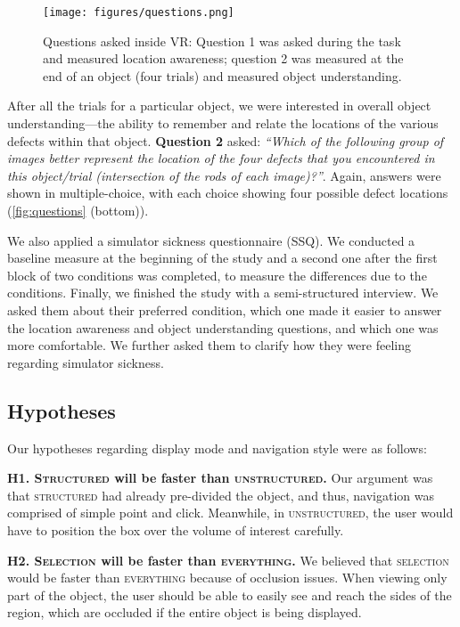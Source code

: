 \begin{figure}[tb]
 \centering
 \texttt{[image: figures/questions.png]}
 \caption{Questions asked inside VR: Question 1 was asked during the task and measured location awareness; question 2 was measured at the end of an object (four trials) and measured object understanding.}
 \label{fig:questions}
 \vspace{-4mm}
\end{figure}

After all the trials for a particular object, we were interested in overall object understanding---the ability to remember and relate the locations of the various defects within that object. \textbf{Question 2} asked: \textit{``Which of the following group of images better represent the location of the four defects that you encountered in this object/trial (intersection of the rods of each image)?''}. Again, answers were shown in multiple-choice, with each choice showing four possible defect locations (\autoref{fig:questions} (bottom)).

We also applied a simulator sickness questionnaire (SSQ). We conducted a baseline measure at the beginning of the study and a second one after the first block of two conditions was completed, to measure the differences due to the conditions. Finally, we finished the study with a semi-structured interview. We asked them about their preferred condition, which one made it easier to answer the location awareness and object understanding questions, and which one was more comfortable. We further asked them to clarify how they were feeling regarding simulator sickness.

\subsection{Hypotheses}
Our hypotheses regarding display mode and navigation style were as follows:

\textbf{H1. \textsc{Structured} will be faster than \textsc{unstructured}.}
Our argument was that \textsc{structured} had already pre-divided the object, and thus, navigation was comprised of simple point and click. Meanwhile, in \textsc{unstructured}, the user would have to position the box over the volume of interest carefully.

\textbf{H2. \textsc{Selection} will be faster than \textsc{everything}.}
We believed that \textsc{selection} would be faster than \textsc{everything} because of occlusion issues. When viewing only part of the object, the user should be able to easily see and reach the sides of the region, which are occluded if the entire object is being displayed.

